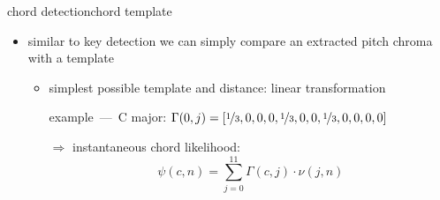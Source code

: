         \begin{frame}{chord detection}{chord template}
            \begin{itemize}
                \item similar to key detection we can simply compare an extracted pitch chroma with a template
                    \begin{itemize}
                        \item	simplest possible template and distance: linear transformation  
                    
                            example~---~C major: $\Gamma(0,j) = [\nicefrac{1}{3},0,0,0,\nicefrac{1}{3},0,0,\nicefrac{1}{3},0,0,0,0]$
                        \smallskip
                        \item[$\Rightarrow$]	instantaneous chord likelihood:
                        \begin{equation*}
                            {\psi}(c,n) = \sum\limits_{j = 0}^{11}{\Gamma(c,j)\cdot \nu(j,n)}
                        \end{equation*}
                    \end{itemize}	
            \end{itemize}
        \end{frame}
        
